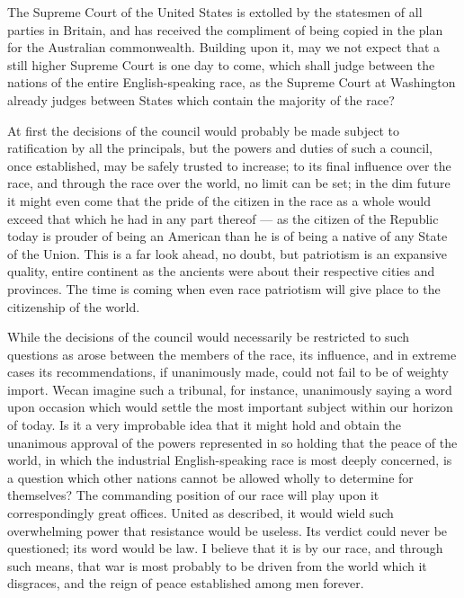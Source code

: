 \documentclass[11pt,openany]{book}
\begin{document}
The Supreme Court of the United States is extolled by the statesmen of all parties in Britain, and has received the compliment of being copied in the plan for the Australian commonwealth. Building upon it, may we not expect that a still higher Supreme Court is one day to come, which shall judge between the nations of the entire English-speaking race, as the Supreme Court at Washington already judges between States which contain the majority of the race?

At first the decisions of the council would probably be made subject to ratification by all the principals, but the powers and duties of such a council, once established, may be safely trusted to increase; to its final influence over the race, and through the race over the world, no limit can be set; in the dim future it might even come that the pride of the citizen in the race as a whole would exceed that which he had in any part thereof --- as the citizen of the Republic today is prouder of being an American than he is of being a native of any State of the Union. This is a far look ahead, no doubt, but patriotism is an expansive quality, entire continent as the ancients were about their respective cities and provinces. The time is coming when even race patriotism will give place to the citizenship of the world.

While the decisions of the council would necessarily be restricted to such questions as arose between the members of the race, its influence, and in extreme cases its recommendations, if unanimously made, could not fail to be of weighty import. Wecan imagine such a tribunal, for instance, unanimously saying a word upon occasion which would settle the most important subject within our horizon of today. Is it a very improbable idea that it might hold and obtain the unanimous approval of the powers represented in so holding that the peace of the world, in which the industrial English-speaking race is most deeply concerned, is a question which other nations cannot be allowed wholly to determine for themselves? The commanding position of our race will play upon it correspondingly great offices. United as described, it would wield such overwhelming power that resistance would be useless. Its verdict could never be questioned; its word would be law. I believe that it is by our race, and through such means, that war is most probably to be driven from the world which it disgraces, and the reign of peace established among men forever.
\end{document}
